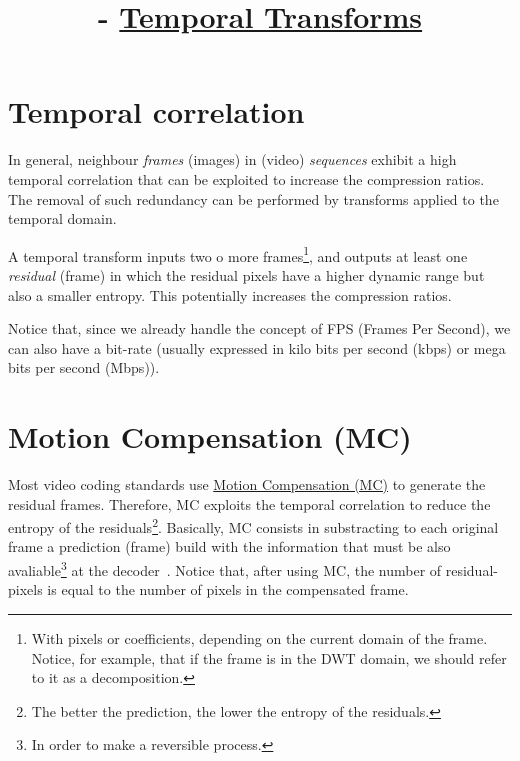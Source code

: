 


\title{\SM{} - \href{https://github.com/Sistemas-Multimedia/Sistemas-Multimedia.github.io/tree/master/contents/temporal_transforms}{Temporal Transforms}}

\maketitle
\tableofcontents

\section{Temporal correlation}

In general, neighbour \emph{frames} (images) in (video)
\emph{sequences} exhibit a high temporal correlation that can be
exploited to increase the compression ratios. The removal of such
redundancy can be performed by transforms applied to the temporal
domain.

A temporal transform inputs two o more frames\footnote{With pixels or
  coefficients, depending on the current domain of the frame. Notice,
  for example, that if the frame is in the DWT domain, we should refer
  to it as a decomposition.}, and outputs at least one \emph{residual}
(frame) in which the residual pixels have a higher dynamic range but
also a smaller entropy. This potentially increases the compression
ratios.

Notice that, since we already handle the concept of FPS (Frames Per
Second), we can also have a bit-rate (usually expressed in kilo bits
per second (kbps) or mega bits per second (Mbps)).


\section{Motion Compensation (MC)}

Most video coding standards use
\href{https://en.wikipedia.org/wiki/Motion_compensation}{Motion
  Compensation (MC)} to generate the residual
frames. Therefore, MC exploits the temporal correlation to reduce the
entropy of the residuals\footnote{The better the prediction, the lower
  the entropy of the residuals.}. Basically, MC consists in
substracting to each original frame a prediction (frame) build with the
information that must be also avaliable\footnote{In order to make a
  reversible process.} at the decoder~\cite{vruiz__MC}. Notice that,
after using MC, the number of residual-pixels is equal to the number
of pixels in the compensated frame.

